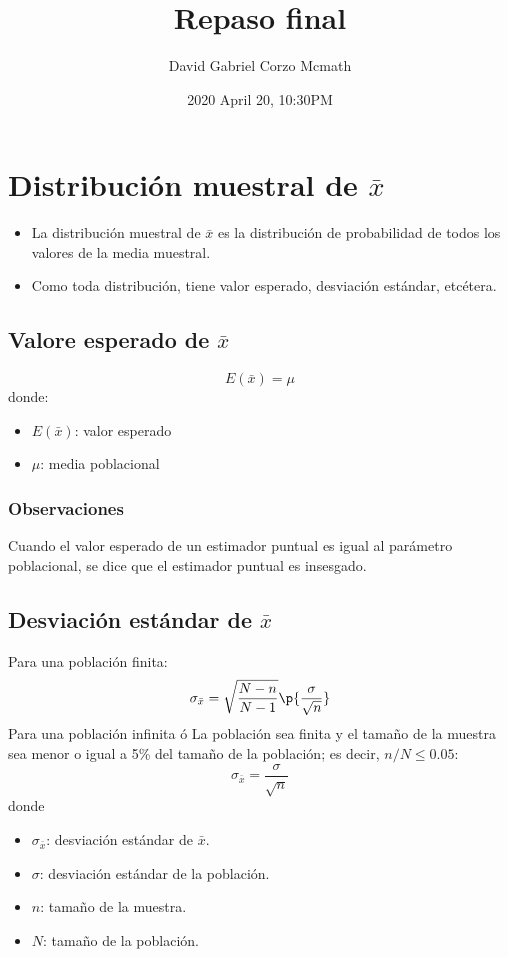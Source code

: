 \documentclass{article}
\title{Repaso final}
\date{2020 April 20, 10:30PM}
\author{David Gabriel Corzo Mcmath}
\begin{document}
\maketitle

\section{Distribución muestral de $\bar{x}$}
\begin{itemize}
    \item La distribución muestral de $\bar{x}$ es la distribución de probabilidad de todos los valores de la media muestral. 
    \item Como toda distribución, tiene valor esperado, desviación estándar, etcétera. 
\end{itemize}
% 
\subsection{Valore esperado de $\bar{x}$ }
\[
  E(\bar{x}) = \mu 
\]donde:
\begin{itemize}
    \item $E(\bar{x})$: valor esperado 
    \item $\mu $: media poblacional 
\end{itemize}
\subsubsection{Observaciones}
Cuando el valor esperado de un estimador puntual es igual al parámetro poblacional, se dice que el estimador puntual es insesgado.

% 
\subsection{Desviación estándar de $\bar{x}$}
Para una población finita: 
\[
    \sigma_{\bar{x}} = \sqrt{\frac{N-n}{N-1} }\p{\frac{\sigma}{\sqrt{n}} } 
\]
Para una población infinita ó La población sea finita y el tamaño de la muestra sea menor o igual a 5\% del tamaño de la población; es decir, $n/N \leq 0.05$: 
\[
  \sigma_{\bar{x}} = \frac{\sigma}{\sqrt{n}} 
\]
donde
\begin{itemize}
    \item $\sigma_{\bar{x}}$: desviación estándar de $\bar{x}$.
    \item $\sigma$: desviación estándar de la población. 
    \item $n$: tamaño de la muestra.
    \item $N$: tamaño de la población. 
\end{itemize}
\end{document}
